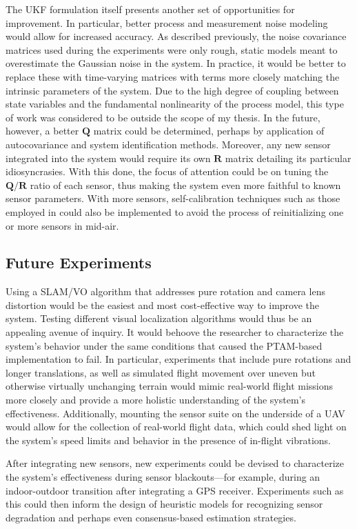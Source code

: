 The UKF formulation itself presents another set of opportunities for improvement. In particular, better process and measurement noise modeling would allow for increased accuracy. As described previously, the noise covariance matrices used during the experiments were only rough, static models meant to overestimate the Gaussian noise in the system. In practice, it would be better to replace these with time-varying matrices with terms more closely matching the intrinsic parameters of the system. Due to the high degree of coupling between state variables and the fundamental nonlinearity of the process model, this type of work was considered to be outside the scope of my thesis. In the future, however, a better $\mathbf{Q}$ matrix could be determined, perhaps by application of autocovariance and system identification methods. Moreover, any new sensor integrated into the system would require its own $\mathbf{R}$ matrix detailing its particular idiosyncrasies. With this done, the focus of attention could be on tuning the $\mathbf{Q} / \mathbf{R}$ ratio of each sensor, thus making the system even more faithful to known sensor parameters. With more sensors, self-calibration techniques such as those employed in \cite{Weiss2012} could also be implemented to avoid the process of reinitializing one or more sensors in mid-air.

\subsection{Future Experiments}

Using a SLAM/VO algorithm that addresses pure rotation and camera lens distortion would be the easiest and most cost-effective way to improve the system. Testing different visual localization algorithms would thus be an appealing avenue of inquiry. It would behoove the researcher to characterize the system's behavior under the same conditions that caused the PTAM-based implementation to fail. In particular, experiments that include pure rotations and longer translations, as well as simulated flight movement over uneven but otherwise virtually unchanging terrain would mimic real-world flight missions more closely and provide a more holistic understanding of the system's effectiveness. Additionally, mounting the sensor suite on the underside of a UAV would allow for the collection of real-world flight data, which could shed light on the system's speed limits and behavior in the presence of in-flight vibrations.

After integrating new sensors, new experiments could be devised to characterize the system's effectiveness during sensor blackouts---for example, during an indoor-outdoor transition after integrating a GPS receiver. Experiments such as this could then inform the design of heuristic models for recognizing sensor degradation and perhaps even consensus-based estimation strategies. 

